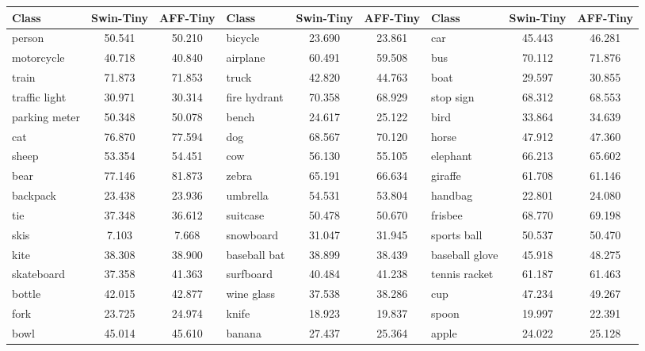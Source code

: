 \documentclass[10pt,twocolumn,letterpaper]{article}
\begin{document}
\begin{table*}
\begin{center}
\begin{footnotesize}
\begin{tabular}{l|c|c||l|c|c||l|c|c}
Class & Swin-Tiny & AFF-Tiny & Class & Swin-Tiny & AFF-Tiny & Class & Swin-Tiny & AFF-Tiny \\\hline
person        & 50.541 & 50.210 & bicycle      & 23.690 & 23.861 & car            & 45.443 & 46.281 \\
 motorcycle    & 40.718 & 40.840 & airplane     & 60.491 & 59.508 & bus            & 70.112 & 71.876 \\
 train         & 71.873 & 71.853 & truck        & 42.820 & 44.763 & boat           & 29.597 & 30.855 \\
 traffic light & 30.971 & 30.314 & fire hydrant & 70.358 & 68.929 & stop sign      & 68.312 & 68.553 \\
 parking meter & 50.348 & 50.078 & bench        & 24.617 & 25.122 & bird           & 33.864 & 34.639 \\
 cat           & 76.870 & 77.594 & dog          & 68.567 & 70.120 & horse          & 47.912 & 47.360 \\
 sheep         & 53.354 & 54.451 & cow          & 56.130 & 55.105 & elephant       & 66.213 & 65.602 \\
 bear          & 77.146 & 81.873 & zebra        & 65.191 & 66.634 & giraffe        & 61.708 & 61.146 \\
 backpack      & 23.438 & 23.936 & umbrella     & 54.531 & 53.804 & handbag        & 22.801 & 24.080 \\
 tie           & 37.348 & 36.612 & suitcase     & 50.478 & 50.670 & frisbee        & 68.770 & 69.198 \\
 skis          & 7.103  & 7.668  & snowboard    & 31.047 & 31.945 & sports ball    & 50.537 & 50.470 \\
 kite          & 38.308 & 38.900 & baseball bat & 38.899 & 38.439 & baseball glove & 45.918 & 48.275 \\
 skateboard    & 37.358 & 41.363 & surfboard    & 40.484 & 41.238 & tennis racket  & 61.187 & 61.463 \\
 bottle        & 42.015 & 42.877 & wine glass   & 37.538 & 38.286 & cup            & 47.234 & 49.267 \\
 fork          & 23.725 & 24.974 & knife        & 18.923 & 19.837 & spoon          & 19.997 & 22.391 \\
 bowl          & 45.014 & 45.610 & banana       & 27.437 & 25.364 & apple          & 24.022 & 25.128 \\

\end{tabular}
\end{footnotesize}
\end{center}
\end{table*}
\end{document}
